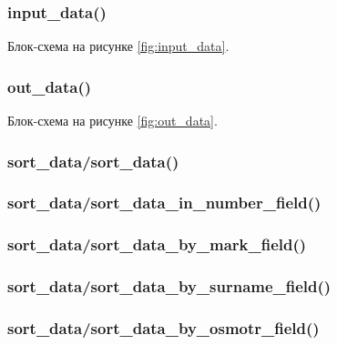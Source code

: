 \documentclass[12pt, a4paper]{article}
\begin{document}
\subsubsection{input\_data()}
Блок-схема на рисунке \ref{fig:input_data}.



\subsubsection{out\_data()}
Блок-схема на рисунке \ref{fig:out_data}.



\subsubsection{sort\_data/sort\_data()}



\subsubsection{sort\_data/sort\_data\_in\_number\_field()}



\subsubsection{sort\_data/sort\_data\_by\_mark\_field()}



\subsubsection{sort\_data/sort\_data\_by\_surname\_field()}



\subsubsection{sort\_data/sort\_data\_by\_osmotr\_field()}


\end{document}
